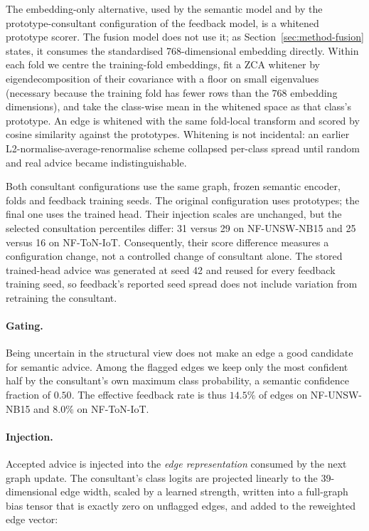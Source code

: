 The embedding-only alternative, used by the semantic model and by the prototype-consultant
configuration of the feedback model, is a whitened prototype scorer. The fusion model does not
use it; as Section~\ref{sec:method-fusion} states, it consumes the standardised 768-dimensional
embedding directly. Within each fold we centre the training-fold embeddings, fit a ZCA whitener
by eigendecomposition of their covariance with a floor on small eigenvalues (necessary
because the training fold has fewer rows than the 768 embedding dimensions), and take the
class-wise mean in the whitened space as that class's prototype. An edge is whitened with the
same fold-local transform and scored by cosine similarity against the prototypes. Whitening
is not incidental: an earlier L2-normalise-average-renormalise scheme collapsed per-class
spread until random and real advice became indistinguishable.

Both consultant configurations use the same graph, frozen semantic encoder, folds and feedback training seeds. The original configuration uses prototypes; the final one uses the trained head. Their injection scales are unchanged, but the selected consultation percentiles differ: 31 versus 29 on NF-UNSW-NB15 and 25 versus 16 on NF-ToN-IoT. Consequently, their score difference measures a configuration change, not a controlled change of consultant alone. The stored trained-head advice was generated at seed 42 and reused for every feedback training seed, so feedback's reported seed spread does not include variation from retraining the consultant.

\paragraph{Gating.} Being uncertain in the structural view does not make an edge a good
candidate for semantic advice. Among the flagged edges we keep only the most confident half by
the consultant's own maximum class probability, a semantic confidence fraction of $0.50$. The
effective feedback rate is thus $14.5\%$ of edges on NF-UNSW-NB15 and $8.0\%$ on NF-ToN-IoT.

\paragraph{Injection.} Accepted advice is injected into the \emph{edge representation}
consumed by the next graph update. The consultant's class logits are projected linearly to the
39-dimensional edge width, scaled by a learned strength, written into a full-graph bias tensor
that is exactly zero on unflagged edges, and added to the reweighted edge vector:

